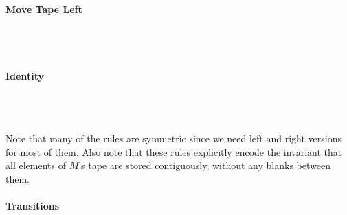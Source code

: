 \documentclass[a4paper,UKenglish,cleveref, autoref]{lipics-v2019}
\begin{document}
\paragraph*{Move Tape Left}
\begin{center}
   \\[3ex]
   \\[3ex]
\end{center}

\paragraph*{Identity}
\begin{center}
  \rewwin{\blank & \blank & \blank}{\blank & \blank & \blank} 
  \\[3ex]
   \\[3ex]
\end{center}

Note that many of the rules are symmetric since we need left and right versions for most of them. 
Also note that these rules explicitly encode the invariant that all elements of $M$'s tape are stored contiguously, without any blanks \blank{} between them.

\paragraph*{Transitions}
\end{document}
